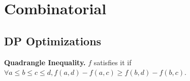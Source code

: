 \chapter{Combinatorial}
% 
\section{DP Optimizations}
\textbf{Quadrangle Inequality.} $f$ satisfies it if $\forall a \le b \le c \le d, f(a, d) - f(a, c) \ge f(b, d) - f(b, c)$.

